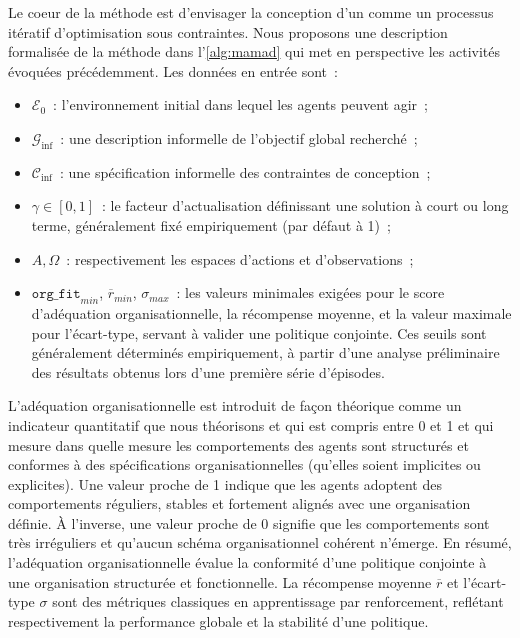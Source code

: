 Le coeur de la méthode  est d'envisager la conception d'un  comme un processus itératif d'optimisation sous contraintes. Nous proposons une description formalisée de la méthode  dans l'\autoref{alg:mamad} qui met en perspective les activités évoquées précédemment. Les données en entrée sont~:
\begin{itemize}
    \item $\mathcal{E}_0$~: l'environnement initial dans lequel les agents peuvent agir~;
    \item $\mathcal{G}_{\text{inf}}$~: une description informelle de l'objectif global recherché~;
    \item $\mathcal{C}_{\text{inf}}$~: une spécification informelle des contraintes de conception~;
    \item $\gamma \in [0,1]$~: le facteur d'actualisation définissant une solution à court ou long terme, généralement fixé empiriquement (par défaut à 1)~;
    \item $A, \Omega$~: respectivement les espaces d'actions et d'observations~;
    \item $\texttt{org\_fit}_{min}$, $\overline{r}_{min}$, $\sigma_{max}$~: les valeurs minimales exigées pour le score d'adéquation organisationnelle, la récompense moyenne, et la valeur maximale pour l'écart-type, servant à valider une politique conjointe. Ces seuils sont généralement déterminés empiriquement, à partir d'une analyse préliminaire des résultats obtenus lors d'une première série d'épisodes.
\end{itemize}

L'adéquation organisationnelle est introduit de façon théorique comme un indicateur quantitatif que nous théorisons et qui est compris entre 0 et 1 et qui mesure dans quelle mesure les comportements des agents sont structurés et conformes à des spécifications organisationnelles (qu'elles soient implicites ou explicites). Une valeur proche de 1 indique que les agents adoptent des comportements réguliers, stables et fortement alignés avec une organisation définie. À l'inverse, une valeur proche de 0 signifie que les comportements sont très irréguliers et qu'aucun schéma organisationnel cohérent n'émerge. En résumé, l'adéquation organisationnelle évalue la conformité d'une politique conjointe à une organisation structurée et fonctionnelle.
La récompense moyenne $\overline{r}$ et l'écart-type $\sigma$ sont des métriques classiques en apprentissage par renforcement, reflétant respectivement la performance globale et la stabilité d'une politique.


